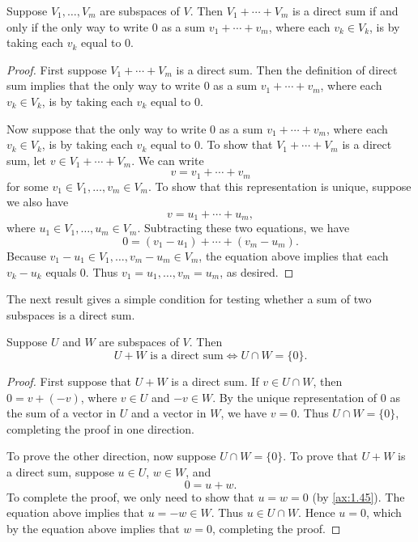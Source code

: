 \begin{result}\label{ax:1.45}
Suppose $V_1,\dots,V_m$ are subspaces of $V$. Then $V_1+\cdots+V_m$ is a direct
sum if and only if the only way to write $0$ as a sum $v_1+\cdots+v_m$, where
each $v_k\in V_k$, is by taking each $v_k$ equal to $0$.
\end{result}

\begin{proof}
First suppose $V_1+\cdots+V_m$ is a direct sum. Then the definition of direct
sum implies that the only way to write $0$ as a sum $v_1+\cdots+v_m$, where each
$v_k\in V_k$, is by taking each $v_k$ equal to $0$.

Now suppose that the only way to write $0$ as a sum $v_1+\cdots+v_m$, where
each $v_k\in V_k$, is by taking each $v_k$ equal to $0$. To show that
$V_1+\cdots+V_m$ is a direct sum, let $v\in V_1+\cdots+V_m$. We can write
\[ v = v_1+\cdots+v_m \]
for some $v_1\in V_1,\dots,v_m\in V_m$. To show that this representation is
unique, suppose we also have
\[ v = u_1+\cdots+u_m, \]
where $u_1\in V_1,\dots,u_m\in V_m$. Subtracting these two equations, we have
\[ 0 = (v_1-u_1)+\cdots+(v_m-u_m). \]
Because $v_1-u_1\in V_1,\dots,v_m-u_m\in V_m$, the equation above implies that
each $v_k-u_k$ equals $0$. Thus $v_1=u_1,\dots,v_m=u_m$, as desired.
\end{proof}

%
The next result gives a simple condition for testing whether a sum of two
subspaces is a direct sum.

\begin{result}\label{ax:1.46}
Suppose $U$ and $W$ are subspaces of $V$. Then
\[ U+W \text{ is a direct sum} \iff U\cap W=\{0\}. \]
\end{result}

\begin{proof}
First suppose that $U+W$ is a direct sum. If $v\in U\cap W$, then
$0=v+(-v)$, where $v\in U$ and $-v\in W$. By the unique representation of $0$
as the sum of a vector in $U$ and a vector in $W$, we have $v=0$. Thus
$U\cap W=\{0\}$, completing the proof in one direction.

To prove the other direction, now suppose $U\cap W=\{0\}$. To prove that $U+W$
is a direct sum, suppose $u\in U$, $w\in W$, and
\[ 0 = u+w. \]
To complete the proof, we only need to show that $u=w=0$ (by \ref{ax:1.45}).
The equation above implies that $u=-w\in W$. Thus $u\in U\cap W$. Hence $u=0$,
which by the equation above implies that $w=0$, completing the proof.
\end{proof}


